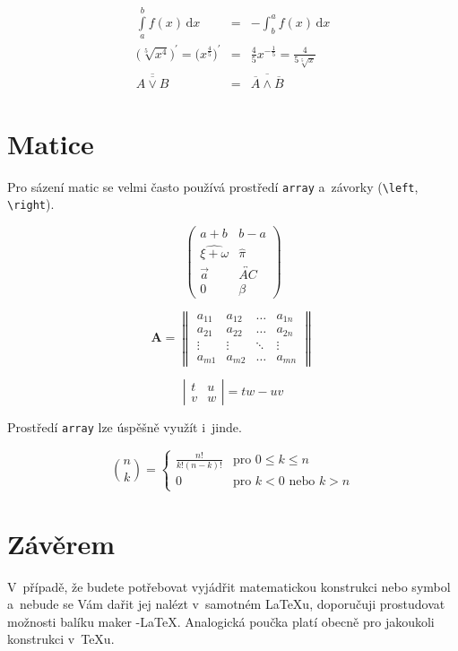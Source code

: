 \documentclass[a4paper, 11pt, twocolumn]{article}
\theoremstyle{definition}
\theoremstyle{plain}
\begin{document}
	\begin{eqnarray}
		\int\limits^b_a f(x) \, \mathrm{d}x & = & - \int^a_b f(x) \, \mathrm{d}x \\
		\Big(\sqrt[5]{x^4}\Big)^\prime = \Big(x^\frac{4}{5}\Big)^\prime & = & \frac{4}{5} x^{- \frac{1}{5}} = \frac{4}{5 \sqrt[5]{x}} \\
		\overline{\overline{A \vee B}} & = & \overline{\overline{A} \wedge \overline{B}}
	\end{eqnarray}


	\section{Matice}

	Pro sázení matic se velmi často používá prostředí \texttt{array} a~závorky (\verb|\left|, \verb|\right|).

	$$
		\left(
		\begin{array}{cc}
			a + b & b - a \\
			\widehat{\xi + \omega} & \hat{\pi} \\
			\vec a & \overleftrightarrow{AC}\\
			0 & \beta
		\end{array}
		\right)
	$$

	$$
		\mathbf{A} =
		\left\|
		\begin{array}{cccc}
			a_{11} & a_{12} & \ldots & a_{1n} \\
			a_{21} & a_{22} & \ldots & a_{2n} \\
			\vdots & \vdots & \ddots & \vdots \\
			a_{m1} & a_{m2} & \ldots & a_{mn}
		\end{array}
		\right\|
	$$

	$$
		\left|
		\begin{array}{cc}
			t & u \\
			v & w
		\end{array}
		\right|
		= tw - uv
	$$

	Prostředí \texttt{array} lze úspěšně využít i~jinde.

	$$
		\binom{n}{k} =
		\left\{
		\begin{array}{ll}
			\frac{n!}{k! (n - k)!} & \text{pro } 0 \leq k \leq n \\
			0 & \text{pro } k < 0 \text{ nebo } k > n
		\end{array}
		\right.
	$$


	\section{Závěrem}

	V~případě, že budete potřebovat vyjádřit matematickou konstrukci nebo symbol a~nebude se Vám dařit
	jej nalézt v~samotném {\LaTeX}u, doporučuji prostudovat možnosti balíku maker \AmS-\LaTeX. Analogická
	poučka platí obec\-ně pro jakoukoli konstrukci v~{\TeX}u.
\end{document}
